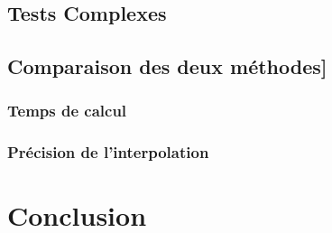 \documentclass[a4paper,9pt]{article}
\begin{document}
\subsection{Tests Complexes}
\label{subsec:tests_complexes}

\subsection{Comparaison des deux méthodes]}
\label{subsec:comparaison_methodes}

\subsubsection{Temps de calcul}
\label{subsec:temps_calcul}

\subsubsection{Précision de l'interpolation}
\label{subsec:precision_interpolation}

\section{Conclusion}
\label{sec:conclusion}
\end{document}
